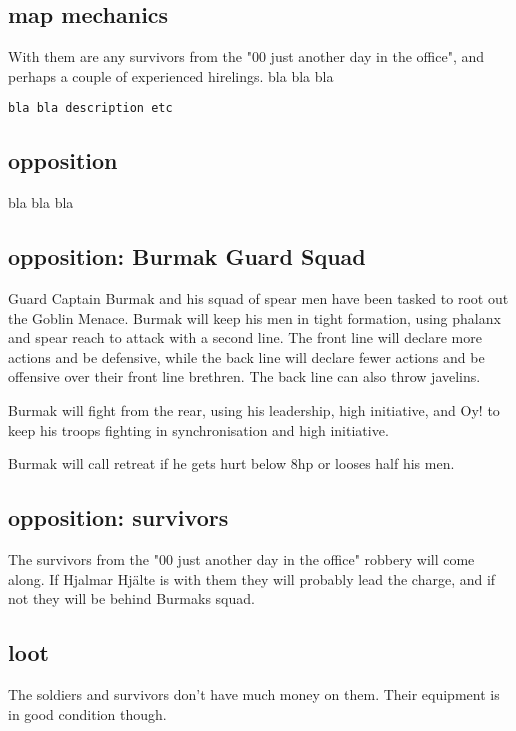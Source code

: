 \subsection*{map mechanics}

With them are any survivors from the "00 just another day in the office", and perhaps a couple of experienced hirelings.
bla bla bla

\small \begin{verbatim}
bla bla description etc
\end{verbatim} \normalsize


\subsection*{opposition}

bla bla bla


\subsection*{opposition: Burmak Guard Squad}

Guard Captain Burmak and his squad of spear men have been tasked to root out the Goblin Menace. Burmak will keep his men in tight formation, using phalanx and spear reach to attack with a second line. The front line will declare more actions and be defensive, while the back line will declare fewer actions and be offensive over their front line brethren. The back line can also throw javelins.

Burmak will fight from the rear, using his leadership, high initiative, and Oy! to keep his troops fighting in synchronisation and high initiative.

Burmak will call retreat if he gets hurt below 8hp or looses half his men.


\subsection*{opposition: survivors}

The survivors from the "00 just another day in the office" robbery will come along. If Hjalmar Hjälte is with them they will probably lead the charge, and if not they will be behind Burmaks squad.


\subsection*{loot}

The soldiers and survivors don't have much money on them. Their equipment is in good condition though.


